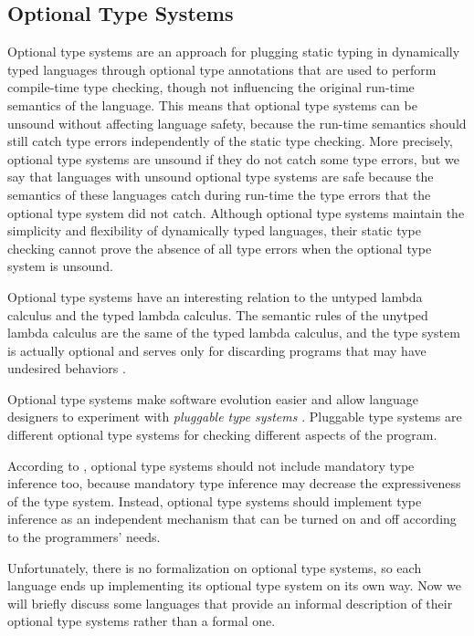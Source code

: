 \documentclass[preprint]{sig-alternate}
\begin{document}
\subsection{Optional Type Systems}

Optional type systems \citep{bracha2004pluggable} are an approach for
plugging static typing in dynamically typed languages through
optional type annotations that are used to perform compile-time type
checking, though not influencing the original run-time semantics of
the language.
This means that optional type systems can be unsound without affecting
language safety, because the run-time semantics should still catch
type errors independently of the static type checking.
More precisely, optional type systems are unsound if they do not catch
some type errors, but we say that languages with unsound optional type
systems are safe because the semantics of these languages catch during
run-time the type errors that the optional type system did not catch.
Although optional type systems maintain the simplicity and
flexibility of dynamically typed languages, their static type
checking cannot prove the absence of all type errors when the optional
type system is unsound.

Optional type systems have an interesting relation to the untyped
lambda calculus and the typed lambda calculus.
The semantic rules of the unytped lambda calculus are the same of the
typed lambda calculus, and the type system is actually optional and
serves only for discarding programs that may have undesired behaviors
\citep{bracha2004pluggable}.

Optional type systems make software evolution easier and
allow language designers to experiment with
\textit{pluggable type systems} \citep{bracha2004pluggable}.
Pluggable type systems are different optional type systems for
checking different aspects of the program.

According to \citet{bracha2004pluggable}, optional type systems should
not include mandatory type inference too, because mandatory type
inference may decrease the expressiveness of the type system.
Instead, optional type systems should implement type inference as
an independent mechanism that can be turned on and off according to
the programmers' needs.

Unfortunately, there is no formalization on optional type systems,
so each language ends up implementing its optional type system on
its own way.
Now we will briefly discuss some languages that provide an informal
description of their optional type systems rather than a formal one.
\end{document}
